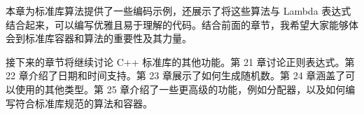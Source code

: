 本章为标准库算法提供了一些编码示例，还展示了将这些算法与 Lambda 表达式结合起来，可以编写优雅且易于理解的代码。结合前面的章节，我希望大家能够体会到标准库容器和算法的重要性及其力量。

接下来的章节将继续讨论 C++ 标准库的其他功能。第 21 章讨论正则表达式。第 22 章介绍了日期和时间支持。第 23 章展示了如何生成随机数。第 24 章涵盖了可以使用的其他类型。第 25 章介绍了一些更高级的功能，例如分配器，以及如何编写符合标准库规范的算法和容器。